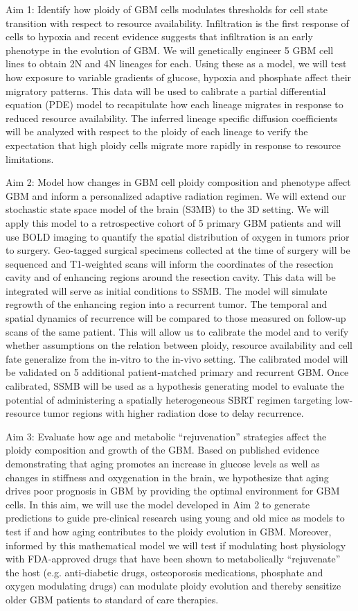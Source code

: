 \documentclass[times,twoside]{zHenriquesLab-StyleBioRxiv}
\begin{document}
Aim 1: Identify how ploidy of GBM cells modulates thresholds for cell state transition with respect to resource availability. Infiltration is the first response of cells to hypoxia and recent evidence suggests that infiltration is an early phenotype in the evolution of GBM. We will genetically engineer 5 GBM cell lines to obtain 2N and 4N lineages for each. Using these as a model, we will test how exposure to variable gradients of glucose, hypoxia and phosphate affect their migratory patterns. This data will be used to calibrate a partial differential equation (PDE) model to recapitulate how each lineage migrates in response to reduced resource availability. The inferred lineage specific diffusion coefficients will be analyzed with respect to the ploidy of each lineage to verify the expectation that high ploidy cells migrate more rapidly in response to resource limitations.

Aim 2: Model how changes in GBM cell ploidy composition and phenotype affect GBM and inform a personalized adaptive radiation regimen. We will extend our stochastic state space model of the brain (S3MB)
to the 3D setting. We will apply this model to a retrospective cohort of 5 primary GBM patients and will use BOLD imaging to quantify the spatial distribution of oxygen in tumors prior to surgery. Geo-tagged surgical specimens collected at the time of surgery will be sequenced and T1-weighted scans will inform the coordinates of the resection cavity and of enhancing regions around the resection cavity. This data will be integrated will serve as initial conditions to SSMB. The model will simulate regrowth of the enhancing region into a recurrent tumor. The temporal and spatial dynamics of recurrence will be compared to those measured on follow-up scans of the same patient. This will allow us to calibrate the model and to verify whether assumptions on the relation between ploidy, resource availability and cell fate generalize from the in-vitro to the in-vivo setting. The calibrated model will be validated on 5 additional patient-matched primary and recurrent GBM. Once calibrated, SSMB will be used as a hypothesis generating model to evaluate the potential of administering a spatially heterogeneous SBRT regimen targeting low-resource tumor regions with higher radiation dose to delay recurrence.

Aim 3: Evaluate how age and metabolic “rejuvenation” strategies affect the ploidy composition and growth of the GBM. Based on published evidence demonstrating that aging promotes an increase in glucose levels as well as changes in stiffness and oxygenation in the brain, we hypothesize that aging drives poor prognosis in GBM by providing the optimal environment for GBM cells. In this aim, we will use the model developed in Aim 2 to generate predictions to guide pre-clinical research using young and old mice as models to test if and how aging contributes to the ploidy evolution in GBM. Moreover, informed by this mathematical model we will test if modulating host physiology with FDA-approved drugs that have been shown to metabolically “rejuvenate” the host (e.g. anti-diabetic drugs, osteoporosis medications, phosphate and oxygen modulating drugs) can modulate ploidy evolution and thereby sensitize older GBM patients to standard of care therapies.
\end{document}
